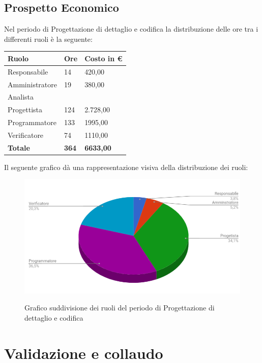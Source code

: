 \documentclass[PianoDiProgetto.tex]{subfiles}
\begin{document}
\subsection{Prospetto Economico}
Nel periodo di Progettazione di dettaglio e codifica la distribuzione delle ore tra i differenti ruoli è la seguente:\begin{center}
\begin{table}[htbp]
	\centering
	\renewcommand\arraystretch{1.5}
	\begin{tabularx}{\textwidth}{p{5cm}|p{4cm}|p{4cm}}
		\hline
		\textbf{Ruolo} & \textbf{Ore} & \textbf{Costo in \euro} \\
		\hline
		Responsabile & 14 & 420,00 \\
		\hline
		Amministratore & 19 & 380,00 \\
		\hline
		Analista & \ & \ \\
		\hline
		Progettista & 124 & 2.728,00 \\
		\hline
		Programmatore & 133 & 1995,00 \\
		\hline
		Verificatore & 74 & 1110,00 \\
		\hline
		\textbf{Totale} & \textbf{364} & \textbf{6633,00}\\
		\hline
	\end{tabularx}
\end{table} 
\end{center}
Il seguente grafico dà una rappresentazione visiva della distribuzione dei ruoli:
\begin{figure}[h]
	\centering
	\includegraphics[width=12.5cm]{images/prospettoEconomico/progCod.png}
	\label{fig:foo}
	\caption{Grafico suddivisione dei ruoli del periodo di Progettazione di dettaglio e codifica}
\end{figure} 
\clearpage

\section{Validazione e collaudo}
\end{document}
